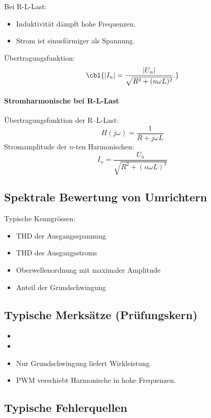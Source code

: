 Bei R-L-Last:
\begin{itemize}
    \item Induktivität dämpft hohe Frequenzen.
    \item Strom ist sinusförmiger als Spannung.
\end{itemize}

Übertragungsfunktion:
\[
\cbl{|I_n| = \frac{|U_n|}{\sqrt{R^2 + (n \omega L)^2}}.}
\]

\paragraph{Stromharmonische bei R-L-Last}
Übertragungsfunktion der R--L-Last:
\[
\boxed{H(j\omega) = \frac{1}{R + j\omega L}}
\]
Stromamplitude der $n$-ten Harmonischen:
\[
I_n = \frac{U_n}{\sqrt{R^2 + (n\omega L)^2}}
\]


\subsection{Spektrale Bewertung von Umrichtern}

Typische Kenngrössen:
\begin{itemize}
    \item THD der Ausgangsspannung
    \item THD des Ausgangsstroms
    \item Oberwellenordnung mit maximaler Amplitude
    \item Anteil der Grundschwingung
\end{itemize}

\subsection{Typische Merksätze (Prüfungskern)}

\begin{itemize}
    \item {}
    \item {}
    \item Nur Grundschwingung liefert Wirkleistung.
    \item PWM verschiebt Harmonische in hohe Frequenzen.
\end{itemize}

\subsection{Typische Fehlerquellen}

